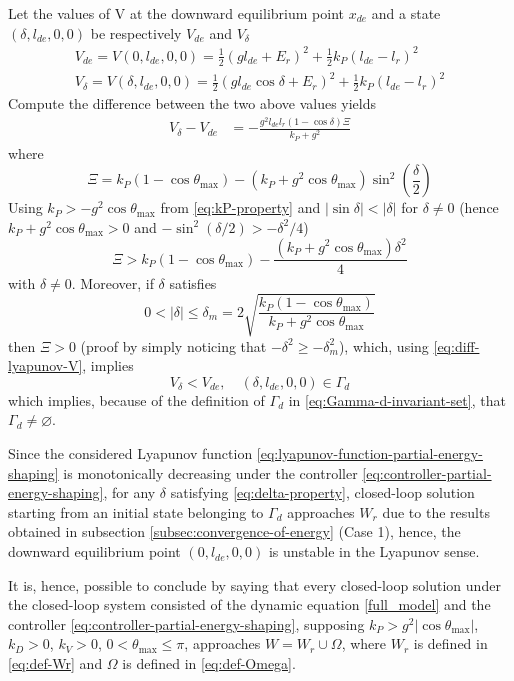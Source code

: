 \documentclass[main.tex]{subfiles}
\begin{document}
Let the values of V at the downward equilibrium point $x_{de}$
and a state $(\delta, l_{de}, 0, 0)$ be respectively $V_{de}$
and $V_\delta$
\begin{gather}
  V_{de} = V(0, l_{de}, 0, 0) = \frac{1}{2}(g l_{de} + E_r)^2
    + \frac{1}{2} k_P (l_{de} - l_r)^2 \\
  V_\delta = V(\delta, l_{de}, 0, 0) = \frac{1}{2}(g l_{de}
    \cos\delta + E_r)^2 + \frac{1}{2} k_P (l_{de} - l_r)^2
\end{gather}
Compute the difference between the two above values yields
\begin{align}
  \label{eq:diff-lyapunov-V}
  V_\delta - V_{de} %
    &= -\frac{g^2 l_{de} l_r (1-\cos\delta) \Xi}{k_P+g^2}
\end{align}
where
\begin{equation}
  \Xi = k_P(1-\cos\theta_{\max})-(k_P+g^2\cos\theta_{\max})
    \sin^2 \left( \frac{\delta}{2} \right)
\end{equation}
Using $k_P > -g^2\cos\theta_{\max}$ from \eqref{eq:kP-property} and
$|\sin \delta|<|\delta|$ for $\delta \neq 0$ (hence
$k_P+g^2\cos\theta_{\max}>0$ and
$-\sin^2(\delta/2)>-\delta^2/4$)
\begin{equation}
  \Xi > k_P(1-\cos\theta_{\max})-
    \frac{(k_P+g^2\cos\theta_{\max})\delta^2}{4}
\end{equation}
with $\delta \neq 0$. Moreover, if $\delta$ satisfies
\begin{equation}
  \label{eq:delta-property}
  0 < |\delta| \le \delta_m = 2
    \sqrt{\frac{k_P(1-\cos\theta_{\max})}{k_P+g^2\cos\theta_{\max}}}
\end{equation}
then $\Xi>0$ (proof by simply noticing that $-\delta^2\ge-\delta_m^2$),
which, using \eqref{eq:diff-lyapunov-V}, implies
\begin{equation}
  V_\delta < V_{de}, \quad (\delta, l_{de}, 0, 0) \in \Gamma_d
\end{equation}
which implies, because of the
definition of $\Gamma_d$ in \eqref{eq:Gamma-d-invariant-set},
that $\Gamma_d \neq \varnothing$.

Since the considered Lyapunov function
\eqref{eq:lyapunov-function-partial-energy-shaping} is
monotonically decreasing under the controller \eqref{eq:controller-partial-energy-shaping}, for any $\delta$
satisfying \eqref{eq:delta-property}, closed-loop solution
starting from an initial state belonging to $\Gamma_d$
approaches $W_r$ due to the results obtained in
subsection \ref{subsec:convergence-of-energy} (Case 1),
hence, the downward
equilibrium point $(0, l_{de}, 0, 0)$ is unstable in the
Lyapunov sense.

It is, hence, possible to conclude by saying that
every closed-loop solution under the closed-loop
system consisted of the dynamic equation
\eqref{full_model} and the controller
\eqref{eq:controller-partial-energy-shaping}, supposing
$k_P>g^2|\cos\theta_{\max}|$, $k_D>0$, $k_V>0$,
$0<\theta_{\max}\le\pi$, approaches $W=W_r\cup\Omega$,
where $W_r$ is defined in \eqref{eq:def-Wr} and $\Omega$
is defined in \eqref{eq:def-Omega}.
\end{document}
